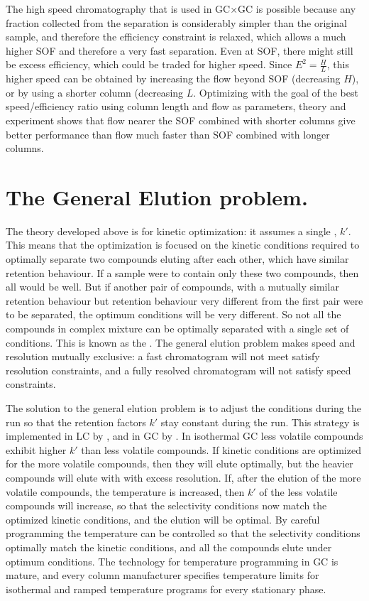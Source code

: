 The high speed chromatography that is used in GC×GC is possible because any
fraction collected from the \oneD separation is considerably simpler than the
original sample, and therefore the efficiency constraint is relaxed, which
allows a much higher SOF and therefore a very fast \twoD separation. Even at
SOF, there might still be excess efficiency, which could be traded for higher
speed. Since \(E^2 = \frac{H}{L} \), this higher speed can be obtained by
increasing the flow beyond SOF (decreasing \(H\)), or by using a shorter column
(decreasing \(L\). Optimizing with the goal of the best speed/efficiency ratio
using column length and flow as parameters, theory and experiment shows that
flow nearer the SOF combined with shorter columns give better performance
\autocite{Klee2002, Reed1999} than flow much faster than SOF combined with
longer columns.

\section{The General Elution problem.}

The theory developed above is for kinetic optimization: it assumes a single
, \(k'\). This means that the optimization is focused
on the kinetic conditions required to optimally separate two compounds eluting
after each other, which have similar retention behaviour. If a sample were to
contain only these two compounds, then all would be well. But if another pair of
compounds, with a mutually similar retention behaviour but retention behaviour
very different from the first pair were to be separated, the optimum conditions
will be very different. So not all the compounds in complex mixture can be
optimally separated with a single set of conditions. This is known as the
 \autocite[p. 779]{Skoog2007}. The general
elution problem makes speed and resolution mutually exclusive: a fast
chromatogram will not meet satisfy resolution constraints, and a fully resolved
chromatogram will not satisfy speed constraints.

The solution to the general elution problem is to adjust the conditions during
the run so that the retention factors \(k'\) stay constant during the run. This
strategy is implemented in LC by , and in GC by
. In isothermal GC less volatile compounds
exhibit higher \(k'\) than less volatile compounds. If kinetic conditions are
optimized for the more volatile compounds, then they will elute optimally, but
the heavier compounds will elute with with excess resolution. If, after the
elution of the more volatile compounds, the temperature is increased, then
\(k'\) of the less volatile compounds will increase, so that the selectivity
conditions now match the optimized kinetic conditions, and the elution will be
optimal. By careful programming the temperature can be controlled so that the
selectivity conditions optimally match the kinetic conditions, and all the
compounds elute under optimum conditions. The technology for temperature
programming in GC is mature, and every column manufacturer specifies temperature
limits for isothermal and ramped temperature programs for every stationary
phase.


